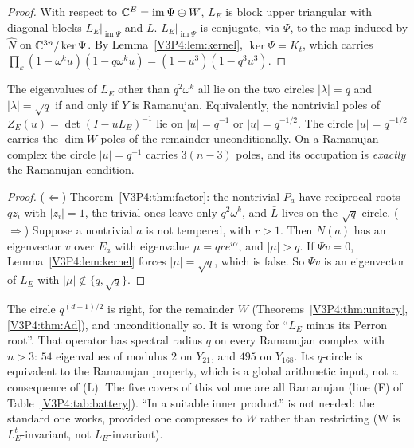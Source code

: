 \begin{proof}
With respect to $\mathbb{C}^{E}=\operatorname{im}\Psi\oplus W$, $L_E$ is block upper triangular with
diagonal blocks $L_E|_{\operatorname{im}\Psi}$ and $\bar L$. $L_E|_{\operatorname{im}\Psi}$ is
conjugate, via $\Psi$, to the map induced by $\widehat N$ on $\mathbb{C}^{3n}/\ker\Psi$. By
Lemma~\ref{V3P4:lem:kernel}, $\ker\Psi=K_t$, which carries
$\prod_k(1-\omega^{k}u)(1-q\omega^{k}u)=(1-u^{3})(1-q^{3}u^{3})$.
\end{proof}

\begin{theorem}\label{V3P4:thm:ramanujan}
The eigenvalues of $L_E$ other than $q^{2}\omega^{k}$ all lie on the two circles
$|\lambda|=q$ and $|\lambda|=\sqrt q$ if and only if $Y$ is Ramanujan. Equivalently, the
nontrivial poles of $Z_E(u)=\det(I-uL_E)^{-1}$ lie on $|u|=q^{-1}$ or $|u|=q^{-1/2}$. The
circle $|u|=q^{-1/2}$ carries the $\dim W$ poles of the remainder unconditionally. On a
Ramanujan complex the circle $|u|=q^{-1}$ carries $3(n-3)$ poles, and its occupation is
\emph{exactly} the Ramanujan condition.
\end{theorem}

\begin{proof}
($\Leftarrow$) Theorem~\ref{V3P4:thm:factor}: the nontrivial $P_a$ have reciprocal roots
$qz_i$ with $|z_i|=1$, the trivial ones leave only $q^{2}\omega^{k}$, and $\bar L$ lives on the
$\sqrt q$-circle. ($\Rightarrow$) Suppose a nontrivial $a$ is not tempered, with $r>1$. Then
$N(a)$ has an eigenvector $v$ over $E_a$ with eigenvalue $\mu=qre^{i\alpha}$, and $|\mu|>q$. If
$\Psi v=0$, Lemma~\ref{V3P4:lem:kernel} forces $|\mu|=\sqrt q$, which is false. So $\Psi v$ is an
eigenvector of $L_E$ with $|\mu|\notin\{q,\sqrt q\}$.
\end{proof}

\begin{remark}\label{V3P4:rem:spec}
The circle $q^{(d-1)/2}$ is right, for the remainder $W$ (Theorems~\ref{V3P4:thm:unitary},
\ref{V3P4:thm:Ad}), and unconditionally so. It is wrong for ``$L_E$ minus its Perron root''.
That operator has spectral radius $q$ on every Ramanujan complex with $n>3$: $54$ eigenvalues
of modulus $2$ on $Y_{21}$, and $495$ on $Y_{168}$. Its $q$-circle is equivalent to the
Ramanujan property, which is a global arithmetic input, not a consequence of (L). The five
covers of this volume are all Ramanujan (line (F) of Table~\ref{V3P4:tab:battery}). ``In
a suitable inner product'' is not needed: the standard one works, provided one compresses to $W$
rather than restricting (W is $L_E^{t}$-invariant, not $L_E$-invariant).
\end{remark}

